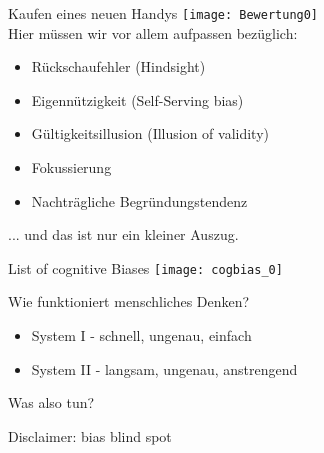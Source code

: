 \begin{frame}[c]{Kaufen eines neuen Handys}
    \texttt{[image: Bewertung0]} \\
    Hier müssen wir vor allem aufpassen bezüglich:
    \begin{itemize}[<+(1)->]
        \item Rückschaufehler (Hindsight)
        \item Eigennützigkeit (Self-Serving bias)
        \item Gültigkeitsillusion (Illusion of validity)
        \item Fokussierung
        \item Nachträgliche Begründungstendenz
    \end{itemize}
\end{frame}




\begin{frame}[standout]
    ... und das ist nur ein kleiner Auszug.
\end{frame}

\begin{frame}[c]{List of cognitive Biases}
    \centering
    \texttt{[image: cogbias\_0]}
\end{frame}



\begin{frame}[c]{Wie funktioniert menschliches Denken?}
    \Large
    \pause
    \begin{itemize}
    \item System I - schnell, ungenau, einfach
    \newline
    \pause
    \item System II - langsam, ungenau, anstrengend
    \newline
    \pause
    \end{itemize}
    Was also tun?
\end{frame}



\begin{frame}[standout]
    Disclaimer: bias blind spot
\end{frame}



